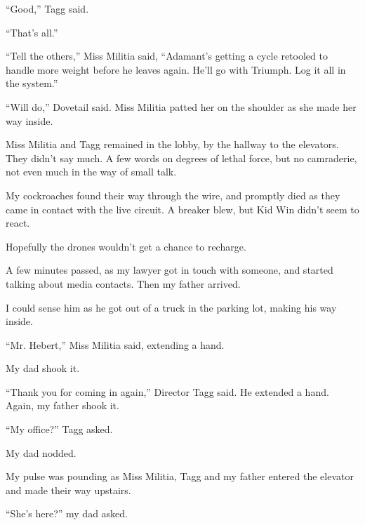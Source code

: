 ``Good,'' Tagg said.



``That's all.''



``Tell the others,'' Miss Militia said, ``Adamant's getting a cycle retooled to handle more weight before he leaves again.  He'll go with Triumph.  Log it all in the system.''



``Will do,'' Dovetail said.  Miss Militia patted her on the shoulder as she made her way inside.



Miss Militia and Tagg remained in the lobby, by the hallway to the elevators.  They didn't say much.  A few words on degrees of lethal force, but no camraderie, not even much in the way of small talk.



My cockroaches found their way through the wire, and promptly died as they came in contact with the live circuit.  A breaker blew, but Kid Win didn't seem to react.



Hopefully the drones wouldn't get a chance to recharge.



A few minutes passed, as my lawyer got in touch with someone, and started talking about media contacts.  Then my father arrived.



I could sense him as he got out of a truck in the parking lot, making his way inside.



``Mr. Hebert,'' Miss Militia said, extending a hand.



My dad shook it.



``Thank you for coming in again,'' Director Tagg said.  He extended a hand.  Again, my father shook it.



``My office?'' Tagg asked.



My dad nodded.



My pulse was pounding as Miss Militia, Tagg and my father entered the elevator and made their way upstairs.



``She's here?'' my dad asked.



